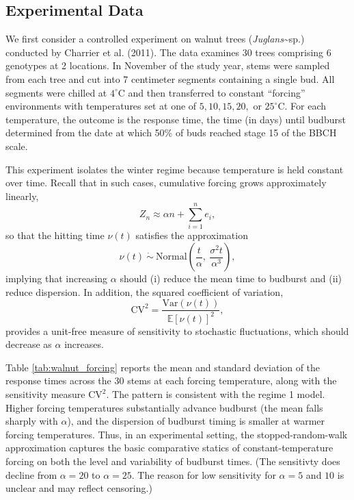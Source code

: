 \subsection{Experimental Data}\label{experimental-data}

We first consider a controlled experiment on walnut trees
(\textit{Juglans}\textasciitilde sp.) conducted by Charrier et al.
(2011). The data examines 30 trees comprising 6 genotypes at 2
locations. In November of the study year, stems were sampled from each
tree and cut into 7 centimeter segments containing a single bud. All
segments were chilled at \(4^\circ\)C and then transferred to constant
``forcing'' environments with temperatures set at one of \(5,10,15,20,\)
or \(25^\circ\)C. For each temperature, the outcome is the response
time, the time (in days) until budburst determined from the date at
which 50\% of buds reached stage 15 of the BBCH scale.

This experiment isolates the winter regime because temperature is held
constant over time. Recall that in such cases, cumulative forcing grows
approximately linearly, \[
Z_n \approx \alpha n + \sum_{i=1}^n e_i,
\] so that the hitting time \(\nu(t)\) satisfies the approximation \[
\nu(t)\ \dot{\sim}\ \mathrm{Normal}\!\left(\frac{t}{\alpha},\ \frac{\sigma^2 t}{\alpha^3}\right),
\] implying that increasing \(\alpha\) should (i) reduce the mean time
to budburst and (ii) reduce dispersion. In addition, the squared
coefficient of variation, \[
\mathrm{CV}^2=\frac{\mathrm{Var}(\nu(t))}{\mathbb{E}[\nu(t)]^2},
\] provides a unit-free measure of sensitivity to stochastic
fluctuations, which should decrease as \(\alpha\) increases.

Table \ref{tab:walnut_forcing} reports the mean and standard deviation
of the response times across the 30 stems at each forcing temperature,
along with the sensitivity measure \(\mathrm{CV}^2\). The pattern is
consistent with the regime 1 model. Higher forcing temperatures
substantially advance budburst (the mean falls sharply with \(\alpha\)),
and the dispersion of budburst timing is smaller at warmer forcing
temperatures. Thus, in an experimental setting, the stopped-random-walk
approximation captures the basic comparative statics of
constant-temperature forcing on both the level and variability of
budburst times. (The sensitivty does decline from \(\alpha = 20\) to
\(\alpha = 25\). The reason for low sensitivity for \(\alpha = 5\) and
\(10\) is unclear and may reflect censoring.)


